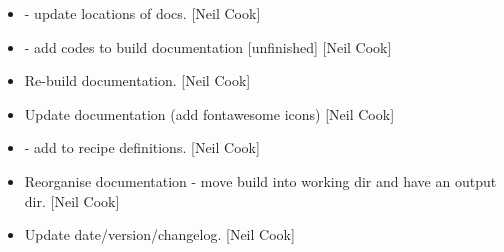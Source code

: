 \documentclass[a4paper,10pt,english]{report}
\begin{document}
\begin{itemize}
\item {} 
 - update locations of docs. {[}Neil
Cook{]}

\item {} 
 - add codes to build
documentation {[}unfinished{]} {[}Neil Cook{]}

\item {} 
Re-build documentation. {[}Neil Cook{]}

\item {} 
Update documentation (add fontawesome icons) {[}Neil Cook{]}

\item {} 
 - add 
 to recipe definitions. {[}Neil Cook{]}

\item {} 
Reorganise documentation - move build into working dir and have an
output dir. {[}Neil Cook{]}

\item {} 
Update date/version/changelog. {[}Neil Cook{]}

\end{itemize}
\end{document}
